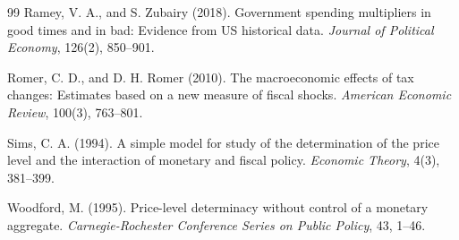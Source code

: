 \documentclass[12pt,a4paper]{article}
\begin{document}
\begin{thebibliography}{99}
Ramey, V. A., and S. Zubairy (2018).
Government spending multipliers in good times and in bad: Evidence from US historical data.
\emph{Journal of Political Economy}, 126(2), 850--901.

Romer, C. D., and D. H. Romer (2010).
The macroeconomic effects of tax changes: Estimates based on a new measure of fiscal shocks.
\emph{American Economic Review}, 100(3), 763--801.

Sims, C. A. (1994).
A simple model for study of the determination of the price level and the interaction of monetary and fiscal policy.
\emph{Economic Theory}, 4(3), 381--399.

Woodford, M. (1995).
Price-level determinacy without control of a monetary aggregate.
\emph{Carnegie-Rochester Conference Series on Public Policy}, 43, 1--46.

\end{thebibliography}
\end{document}
